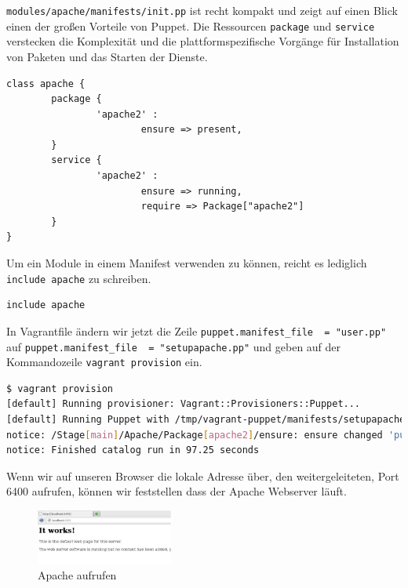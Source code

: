 \documentclass[12pt,a4paper,ngerman]{article}
\begin{document}
\lstinline$modules/apache/manifests/init.pp$ ist recht kompakt und zeigt auf einen Blick einen der großen Vorteile von Puppet. Die Ressourcen \lstinline$package$ und \lstinline$service$ verstecken die Komplexität und die plattformspezifische Vorgänge für Installation von Paketen und das Starten der Dienste.
\begin{lstlisting}[language=puppet,caption=Inhalt von modules/apache/manifests/init.pp, label=apache-init.pp]
class apache {
        package {
                'apache2' :
                        ensure => present,
        }
        service {
                'apache2' :
                        ensure => running,
                        require => Package["apache2"]
        }
}
\end{lstlisting}

Um ein Module in einem Manifest verwenden zu können, reicht es lediglich \lstinline$include apache$ zu schreiben.
\begin{lstlisting}[language=puppet,caption=Inhalt von manifests/setupapache.pp, label=setupapache.pp]
include apache
\end{lstlisting}

In Vagrantfile ändern wir jetzt die Zeile \lstinline$puppet.manifest_file  = "user.pp"$ auf \lstinline$puppet.manifest_file  = "setupapache.pp"$ und geben auf der Kommandozeile \lstinline$vagrant provision$ ein.

\begin{lstlisting}[language=sh,caption=vagrant provisioning für Apache, label=provisioning_apache]
$ vagrant provision
[default] Running provisioner: Vagrant::Provisioners::Puppet...
[default] Running Puppet with /tmp/vagrant-puppet/manifests/setupapache.pp...
notice: /Stage[main]/Apache/Package[apache2]/ensure: ensure changed 'purged' to 'present'
notice: Finished catalog run in 97.25 seconds
\end{lstlisting}

Wenn wir auf unseren Browser die lokale Adresse über, den weitergeleiteten, Port 6400 aufrufen, können wir feststellen dass der Apache Webserver läuft.
\begin{figure}
  \begin{center}
    \includegraphics[width=0.4\textwidth]{images/apache.pdf}
  \end{center}
  \caption{Apache aufrufen}
  \label{apache}
\end{figure}
\end{document}
